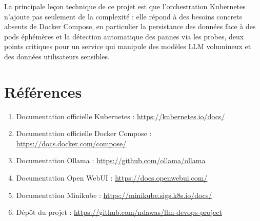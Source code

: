 \documentclass[11pt,a4paper]{article}
\begin{document}
La principale leçon technique de ce projet est que l'orchestration Kubernetes n'ajoute pas seulement de la complexité : elle répond à des besoins concrets absents de Docker Compose, en particulier la persistance des données face à des pods éphémères et la détection automatique des pannes via les probes, deux points critiques pour un service qui manipule des modèles LLM volumineux et des données utilisateurs sensibles.

\section*{Références}
\begin{enumerate}[leftmargin=1.2cm]
    \item Documentation officielle Kubernetes : \url{https://kubernetes.io/docs/}
    \item Documentation officielle Docker Compose : \url{https://docs.docker.com/compose/}
    \item Documentation Ollama : \url{https://github.com/ollama/ollama}
    \item Documentation Open WebUI : \url{https://docs.openwebui.com/}
    \item Documentation Minikube : \url{https://minikube.sigs.k8s.io/docs/}
    \item Dépôt du projet : \url{https://github.com/ndawas/llm-devops-project}
\end{enumerate}
\end{document}

